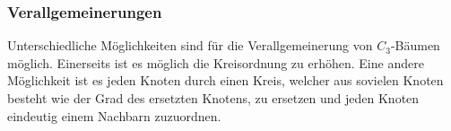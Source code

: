 \subsubsection{Verallgemeinerungen}
Unterschiedliche Möglichkeiten sind für die Verallgemeinerung von $C_3$-Bäumen möglich. Einerseits ist es möglich die Kreisordnung zu erhöhen. Eine andere Möglichkeit ist es jeden Knoten durch einen Kreis, welcher aus sovielen Knoten besteht wie der Grad des ersetzten Knotens, zu ersetzen und jeden Knoten eindeutig einem Nachbarn zuzuordnen.

